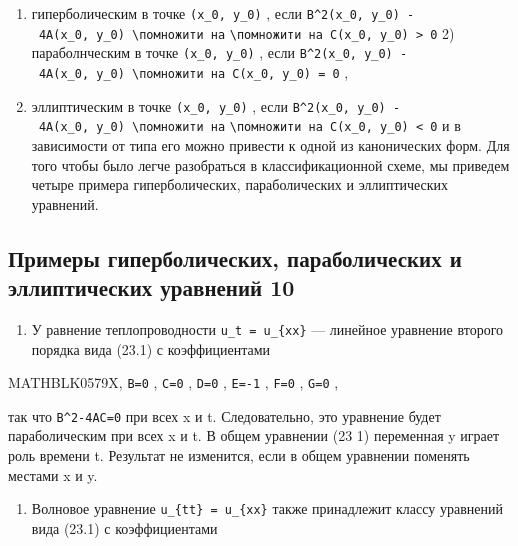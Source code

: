 \documentclass[
  ukrainian,
]{article}
\providecommand{\tightlist}{%
  \setlength{\itemsep}{0pt}\setlength{\parskip}{0pt}}
\begin{document}
\begin{enumerate}
\def\labelenumi{\arabic{enumi})}
\item
  гиперболическим в точке \texttt{(x\_0,\ y\_0)} , если
  \texttt{B\^{}2(x\_0,\ y\_0)\ -\ 4A(x\_0,\ y\_0)\ \textbackslash{}помножити\ на}
  \texttt{\textbackslash{}помножити\ на\ C(x\_0,\ y\_0)\ \textgreater{}\ 0}
  2) параболнческим в точке \texttt{(x\_0,\ y\_0)} , если
  \texttt{B\^{}2(x\_0,\ y\_0)\ -\ 4A(x\_0,\ y\_0)\ \textbackslash{}помножити\ на\ C(x\_0,\ y\_0)\ =\ 0}
  ,
\item
  эллиптическим в точке \texttt{(x\_0,\ y\_0)} , если
  \texttt{B\^{}2(x\_0,\ y\_0)\ -\ 4A(x\_0,\ y\_0)\ \textbackslash{}помножити\ на}
  \texttt{\textbackslash{}помножити\ на\ C(x\_0,\ y\_0)\ \textless{}\ 0}
  и в зависимости от типа его можно привести к одной из канонических
  форм. Для того чтобы было легче разобраться в классификационной схеме,
  мы приведем четыре примера гиперболических, параболических и
  эллиптических уравнений.
\end{enumerate}

\subsection{Примеры гиперболических, параболических и эллиптических
уравнений
10}\label{ux43fux440ux438ux43cux435ux440ux44b-ux433ux438ux43fux435ux440ux431ux43eux43bux438ux447ux435ux441ux43aux438ux445-ux43fux430ux440ux430ux431ux43eux43bux438ux447ux435ux441ux43aux438ux445-ux438-ux44dux43bux43bux438ux43fux442ux438ux447ux435ux441ux43aux438ux445-ux443ux440ux430ux432ux43dux435ux43dux438ux439-10}

\begin{enumerate}
\def\labelenumi{\arabic{enumi}.}
\tightlist
\item
  У равнение теплопроводности \texttt{u\_t\ =\ u\_\{xx\}} --- линейное
  уравнение второго порядка вида (23.1) с коэффициентами
\end{enumerate}

MATHBLK0579X, \texttt{B=0} , \texttt{C=0} , \texttt{D=0} , \texttt{E=-1}
, \texttt{F=0} , \texttt{G=0} ,

так что \texttt{B\^{}2-4AC=0} при всех x и t. Следовательно, это
уравнение будет параболическим при всех x и t. В общем уравнении (23 1)
переменная y играет роль времени t. Результат не изменится, если в общем
уравнении поменять местами x и y.

\begin{enumerate}
\def\labelenumi{\arabic{enumi}.}
\setcounter{enumi}{1}
\tightlist
\item
  Волновое уравнение \texttt{u\_\{tt\}\ =\ u\_\{xx\}} также принадлежит
  классу уравнений вида (23.1) с коэффициентами
\end{enumerate}
\end{document}
